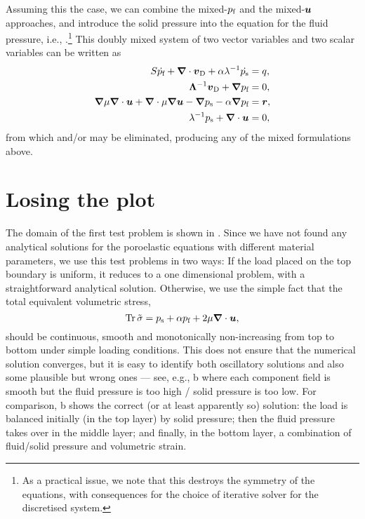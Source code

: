 Assuming this the case, we can combine the mixed-$p_{\text{f}}$ and the mixed-$\boldsymbol{u}$
approaches, and introduce the solid pressure into the equation for the fluid
pressure, i.e., .\footnote{As a practical issue, we note
  that this destroys the symmetry of the equations, with consequences for the
  choice of iterative solver for the discretised system.}
This doubly mixed system of two vector variables and two scalar variables can be
written as
\begin{align}
S\dot{\Pf} + \nabla \cdot \vD + \alpha \lambda^{-1} \dot{\Ps} &= q, \\
\label{eq:mixp}
  \Lambda^{-1} \vD + \nabla \Pf &= 0,\\
\nabla \mu \nabla \cdot \U + \nabla \cdot \mu \nabla \U
 - \nabla \Ps - \alpha \nabla \Pf &= \V{r},\\
\label{eq:mixu}
\lambda^{-1}\Ps+\nabla\cdot\U &= 0,
\end{align}
from which  and/or  may be eliminated, producing any of
the mixed formulations above.

\section{Losing the plot}

The domain of the first test problem is shown in .
Since we have not found any analytical solutions for the poroelastic equations
with different material parameters, we use this test problems in two ways: If
the load placed on the top boundary is uniform, it reduces to a one dimensional
problem, with a straightforward analytical solution.
Otherwise, we use the simple fact that the total equivalent volumetric stress,
\begin{equation}
\trace{\tilde{\sigma}} = \Ps + \alpha \Pf + 2\mu \nabla\cdot\U,
\end{equation}
should be continuous, smooth and monotonically non-increasing from top to bottom
under simple loading conditions.
This does not ensure that the numerical solution converges, but it is easy to
identify both oscillatory solutions and also some plausible but wrong ones
--- see, e.g., b where each component field is smooth
but the fluid pressure is too high / solid pressure is too low.
For comparison, b shows the correct (or at least
apparently so) solution: the load is balanced initially (in the top layer) by
solid pressure; then the fluid pressure takes over in the middle layer; and
finally, in the bottom layer, a combination of fluid/solid pressure and
volumetric strain.

